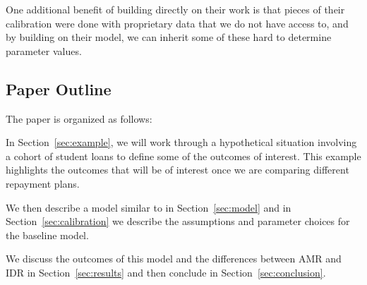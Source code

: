   One additional benefit of building directly on their work is that pieces of their calibration were
  done with proprietary data that we do not have access to, and by building on their model, we can
  inherit some of these hard to determine parameter values.


\subsection{Paper Outline}

  The paper is organized as follows:

  In Section~\ref{sec:example}, we will work through a hypothetical situation involving a cohort
  of student loans to define some of the outcomes of interest. This example highlights the outcomes
  that will be of interest once we are comparing different repayment plans.

  We then describe a model similar to \cite{HendricksLeukhina2017} in Section~\ref{sec:model} and in
  Section~\ref{sec:calibration} we describe the assumptions and parameter choices for the baseline
  model.

  We discuss the outcomes of this model and the differences between AMR and IDR in
  Section~\ref{sec:results} and then conclude in Section~\ref{sec:conclusion}.
